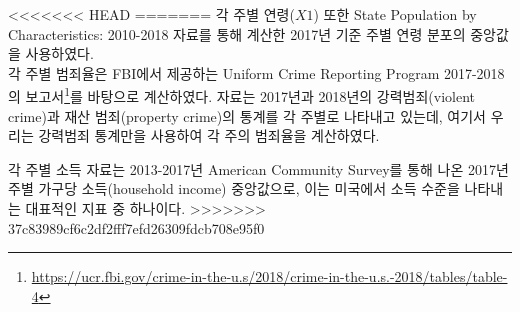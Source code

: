 <<<<<<< HEAD
=======
각 주별 연령($X1$) 또한 State Population by Characteristics: 2010-2018 자료를 통해 계산한 2017년 기준 주별 연령 분포의 중앙값을 사용하였다.
\\
각 주별 범죄율은 FBI에서 제공하는 Uniform Crime Reporting Program 2017-2018의 보고서\footnote{\url{https://ucr.fbi.gov/crime-in-the-u.s/2018/crime-in-the-u.s.-2018/tables/table-4}}를 바탕으로 계산하였다. 자료는 2017년과 2018년의 강력범죄(violent crime)과 재산 범죄(property crime)의 통계를 각 주별로 나타내고 있는데, 여기서 우리는 강력범죄 통계만을 사용하여 각 주의 범죄율을 계산하였다.

각 주별 소득 자료는 2013-2017년 American Community Survey를 통해 나온 2017년 주별 가구당 소득(household income) 중앙값으로, 이는 미국에서 소득 수준을 나타내는 대표적인 지표 중 하나이다.
>>>>>>> 37c83989cf6c2df2fff7efd26309fdcb708e95f0




